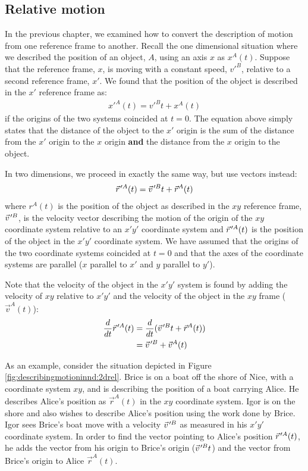 \subsection{Relative motion}
\label{sec:desribingmotioninnd:relativemotion}
In the previous chapter, we examined how to convert the description of motion from one reference frame to another. Recall the one dimensional situation where we described the position of an object, $A$, using an axis $x$ as $x^A(t)$. Suppose that the reference frame, $x$, is moving with a constant speed, $v'^B$, relative to a second reference frame, $x'$. We found that the position of the object is described in the $x'$ reference frame as:
\begin{align*}
x'^A(t)=v'^Bt+x^A(t)
\end{align*}
if the origins of the two systems coincided at $t=0$. The equation above simply states that the distance of the object to the $x'$ origin is the sum of the distance from the $x'$ origin to the $x$ origin \textbf{and} the distance from the $x$ origin to the object.

In two dimensions, we proceed in exactly the same way, but use vectors instead:
\begin{align*}
\pvec r'^A(t) = \pvec v'^Bt+\vec r^A(t)
\end{align*}
where $r^A(t)$ is the position of the object as described in the $xy$ reference frame, $\pvec v'^B$, is the velocity vector describing the motion of the origin of the $xy$ coordinate system relative to an $x'y'$ coordinate system and $\pvec r'^A(t)$ is the position of the object in the $x'y'$ coordinate system. We have assumed that the origins of the two coordinate systems coincided at $t=0$ and that the axes of the coordinate systems are parallel ($x$ parallel to $x'$ and $y$ parallel to $y'$).

Note that the velocity of the object in the $x'y'$ system is found by adding the velocity of $xy$ relative to $x'y'$ and the velocity of the object in the $xy$ frame ($\vec v^A(t)$):
\begin{align*}
\frac{d}{dt}\pvec r'^A(t) &=\frac{d}{dt}(\pvec v'^Bt+\vec r^A(t))\\
&=\pvec v'^B+\vec v^A(t)
\end{align*}

As an example, consider the situation depicted in Figure \ref{fig:describingmotioninnd:2drel}. Brice is on a boat off the shore of Nice, with a coordinate system $xy$, and is describing the position of a boat carrying Alice. He describes Alice's position as $\vec r^A(t)$ in the $xy$ coordinate system. Igor is on the shore and also wishes to describe Alice's position using the work done by Brice. Igor sees Brice's boat move with a velocity $\pvec v'^B$ as measured in his $x'y'$ coordinate system. In order to find the vector pointing to Alice's position $\pvec r'^A(t)$, he adds the vector from his origin to Brice's origin ($\pvec v'^B t$) and the vector from Brice's origin to Alice $\vec r^A(t)$.

